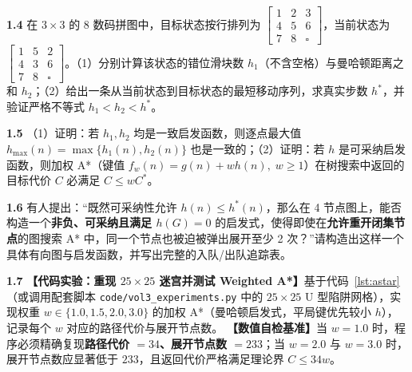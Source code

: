 \textbf{1.4} \quad 在 $3\times 3$ 的 8 数码拼图中，目标状态按行排列为 $\begin{bmatrix}1&2&3\\4&5&6\\7&8&\square\end{bmatrix}$，当前状态为 $\begin{bmatrix}1&5&2\\4&3&6\\7&8&\square\end{bmatrix}$。（1）分别计算该状态的错位滑块数 $h_1$（不含空格）与曼哈顿距离之和 $h_2$；（2）给出一条从当前状态到目标状态的最短移动序列，求真实步数 $h^*$，并验证严格不等式 $h_1 < h_2 < h^*$。


\textbf{1.5} \quad （1）证明：若 $h_1, h_2$ 均是一致启发函数，则逐点最大值 $h_{\max}(n) = \max\{h_1(n), h_2(n)\}$ 也是一致的；（2）证明：若 $h$ 是可采纳启发函数，则加权 A*（键值 $f_w(n) = g(n) + w h(n),\; w \ge 1$）在树搜索中返回的目标代价 $C$ 必满足 $C \le w C^*$。

\textbf{1.6} \quad 有人提出：“既然可采纳性允许 $h(n) \le h^*(n)$，那么在 4 节点图上，能否构造一个\textbf{非负、可采纳且满足 $h(G)=0$} 的启发式，使得即使在\textbf{允许重开闭集节点}的图搜索 A* 中，同一个节点也被迫被弹出展开至少 2 次？”请构造出这样一个具体有向图与启发函数，并写出完整的入队/出队追踪表。


\textbf{1.7} \quad \textbf{【代码实验：重现 $25\times 25$ 迷宫并测试 Weighted A*】}基于代码~\ref{lst:astar}（或调用配套脚本 \texttt{code/\allowbreak vol3\_experiments.py} 中的 $25\times 25$ U 型陷阱网格），实现权重 $w \in \{1.0, 1.5, 2.0, 3.0\}$ 的加权 A*（曼哈顿启发式，平局键优先较小 $h$），记录每个 $w$ 对应的路径代价与展开节点数。
\textbf{【数值自检基准】}当 $w=1.0$ 时，程序必须精确复现\textbf{路径代价 $= 34$、展开节点数 $= 233$}；当 $w=2.0$ 与 $w=3.0$ 时，展开节点数应显著低于 $233$，且返回代价严格满足理论界 $C \le 34 w$。

